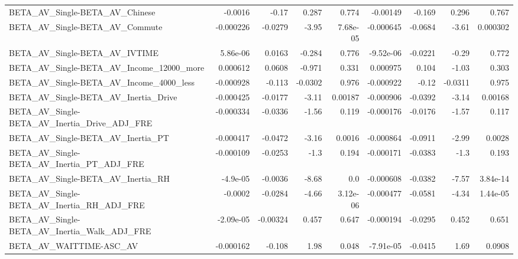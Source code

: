 \begin{tabular}{lrrrrrrrr}
BETA\_AV\_Single-BETA\_AV\_Chinese                     &     -0.0016 &        -0.17 &    0.287 &    0.774 &   -0.00149 &      -0.169 &        0.296 &         0.767 \\
BETA\_AV\_Single-BETA\_AV\_Commute                     &   -0.000226 &      -0.0279 &    -3.95 & 7.68e-05 &  -0.000645 &     -0.0684 &        -3.61 &      0.000302 \\
BETA\_AV\_Single-BETA\_AV\_IVTIME                      &    5.86e-06 &       0.0163 &   -0.284 &    0.776 &  -9.52e-06 &     -0.0221 &        -0.29 &         0.772 \\
BETA\_AV\_Single-BETA\_AV\_Income\_12000\_more           &    0.000612 &       0.0608 &   -0.971 &    0.331 &   0.000975 &       0.104 &        -1.03 &         0.303 \\
BETA\_AV\_Single-BETA\_AV\_Income\_4000\_less            &   -0.000928 &       -0.113 &  -0.0302 &    0.976 &  -0.000922 &       -0.12 &      -0.0311 &         0.975 \\
BETA\_AV\_Single-BETA\_AV\_Inertia\_Drive               &   -0.000425 &      -0.0177 &    -3.11 &  0.00187 &  -0.000906 &     -0.0392 &        -3.14 &       0.00168 \\
BETA\_AV\_Single-BETA\_AV\_Inertia\_Drive\_ADJ\_FRE       &   -0.000334 &      -0.0336 &    -1.56 &    0.119 &  -0.000176 &     -0.0176 &        -1.57 &         0.117 \\
BETA\_AV\_Single-BETA\_AV\_Inertia\_PT                  &   -0.000417 &      -0.0472 &    -3.16 &   0.0016 &  -0.000864 &     -0.0911 &        -2.99 &        0.0028 \\
BETA\_AV\_Single-BETA\_AV\_Inertia\_PT\_ADJ\_FRE          &   -0.000109 &      -0.0253 &     -1.3 &    0.194 &  -0.000171 &     -0.0383 &         -1.3 &         0.193 \\
BETA\_AV\_Single-BETA\_AV\_Inertia\_RH                  &    -4.9e-05 &      -0.0036 &    -8.68 &      0.0 &  -0.000608 &     -0.0382 &        -7.57 &      3.84e-14 \\
BETA\_AV\_Single-BETA\_AV\_Inertia\_RH\_ADJ\_FRE          &     -0.0002 &      -0.0284 &    -4.66 & 3.12e-06 &  -0.000477 &     -0.0581 &        -4.34 &      1.44e-05 \\
BETA\_AV\_Single-BETA\_AV\_Inertia\_Walk\_ADJ\_FRE        &   -2.09e-05 &     -0.00324 &    0.457 &    0.647 &  -0.000194 &     -0.0295 &        0.452 &         0.651 \\
BETA\_AV\_WAITTIME-ASC\_AV                            &   -0.000162 &       -0.108 &     1.98 &    0.048 &  -7.91e-05 &     -0.0415 &         1.69 &        0.0908 \\

\end{tabular}
